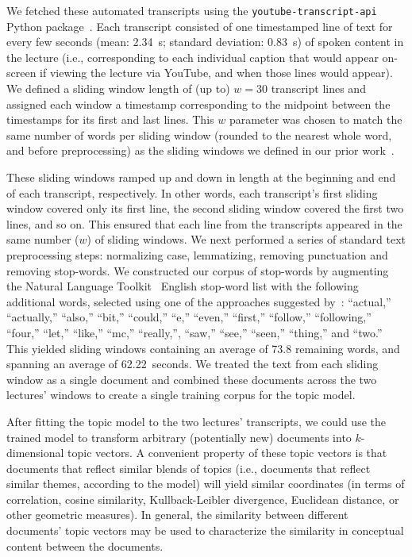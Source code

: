\documentclass[10pt]{article}
\begin{document}
We fetched these automated transcripts using the
\texttt{youtube-transcript-api} Python package~\citep{Depo18}. Each transcript
consisted of one timestamped line of text for every few seconds (mean: 2.34~s;
standard deviation: 0.83~s) of spoken content in the lecture (i.e., corresponding
to each individual caption that would appear on-screen if viewing the lecture
via YouTube, and when those lines would appear). We defined a sliding window
length of (up to) $w = 30$ transcript lines and assigned each window a
timestamp corresponding to the midpoint between the timestamps for its first
and last lines. This $w$ parameter was chosen to match the same number of words
per sliding window (rounded to the nearest whole word, and before
preprocessing) as the sliding windows we defined in our prior
work~\citep[][i.e., 185 words per sliding window]{HeusEtal21}.

These sliding windows ramped up and down in length at the beginning and end of
each transcript, respectively. In other words, each transcript's first sliding
window covered only its first line, the second sliding window covered the first
two lines, and so on. This ensured that each line from the transcripts appeared
in the same number ($w$) of sliding windows. We next performed a series of
standard text preprocessing steps: normalizing case, lemmatizing, removing
punctuation and removing stop-words. We constructed our corpus of stop-words by
augmenting the Natural Language Toolkit~\citep[NLTK; ][]{BirdEtal09} English
stop-word list with the following additional words, selected using one of the
approaches suggested by~\cite{BoydEtal14}: ``actual,'' ``actually,'' ``also,''
``bit,'' ``could,'' ``e,'' ``even,'' ``first,'' ``follow,'' ``following,''
``four,'' ``let,'' ``like,'' ``mc,'' ``really,'', ``saw,'' ``see,'' ``seen,''
``thing,'' and ``two.'' This yielded sliding windows containing an average of 73.8
remaining words, and spanning an average of 62.22~seconds. We treated the
text from each sliding window as a single document and combined these
documents across the two lectures' windows to create a single training corpus for
the topic model.

After fitting the topic model to the two lectures' transcripts, we could use the
trained model to transform arbitrary (potentially new) documents into
$k$-dimensional topic vectors. A convenient property of these topic vectors is
that documents that reflect similar blends of topics (i.e., documents that
reflect similar themes, according to the model) will yield similar coordinates
(in terms of correlation, cosine similarity, Kullback-Leibler divergence,
Euclidean distance, or other geometric measures). In general, the similarity
between different documents' topic vectors may be used to characterize the
similarity in conceptual content between the documents.
\end{document}
